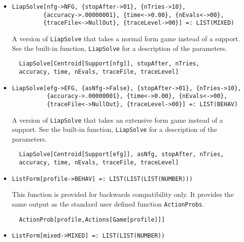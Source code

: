 \begin{itemize}
\item{}
\protect \large \begin{verbatim}
LiapSolve[nfg->NFG, {stopAfter->01}, {nTries->10}, 
         {accuracy->.00000001}, {time<->0.00}, {nEvals<->00}, 
         {traceFile<->NullOut}, {traceLevel->00}] =: LIST(MIXED)
\end{verbatim}\normalsize

\bd 
A version of \verb+LiapSolve+ that takes a normal form
game instead of a support.  See the built-in function,
\verb+LiapSolve+ for a description of the parameters.
\begin{verbatim}
  LiapSolve[Centroid[Support[nfg]], stopAfter, nTries,
  accuracy, time, nEvals, traceFile, traceLevel]
\end{verbatim} 
\ed

\item{}
\protect \large \begin{verbatim}
LiapSolve[efg->EFG, {asNfg->False}, {stopAfter->01}, {nTries->10}, 
          {accuracy->.00000001}, {time<->0.00}, {nEvals<->00}, 
          {traceFile<->NullOut}, {traceLevel->00}] =: LIST(BEHAV)
\end{verbatim}\normalsize

\bd 
A version of \verb+LiapSolve+ that takes an extensive form
game instead of a support.  See the built-in function,
\verb+LiapSolve+ for a description of the parameters.
\begin{verbatim}
  LiapSolve[Centroid[Support[efg]], asNfg, stopAfter, nTries,
  accuracy, time, nEvals, traceFile, traceLevel]
\end{verbatim} 
\ed

\item{}
\protect \large \begin{verbatim}
ListForm[profile->BEHAV] =: LIST(LIST(LIST(NUMBER))) 
\end{verbatim}\normalsize

\bd 
This function is provided for backwards compatibility only.  It
provides the same output as the standard user defined function \verb+ActionProbs+.
\begin{verbatim}
  ActionProb[profile,Actions[Game[profile]]]
\end{verbatim} 
\ed

\item{}
\protect \large \begin{verbatim}
ListForm[mixed->MIXED] =: LIST(LIST(NUMBER)) 
\end{verbatim}\normalsize


\end{itemize}
